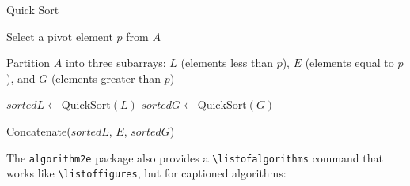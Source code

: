 \documentclass[11pt]{article}
\begin{document}
\begin{algorithm}[hbt!]
    \caption{Quick Sort}\label{alg:quick_sort}
    
    
    Select a pivot element $p$ from $A$ 
    
    Partition $A$ into three subarrays: $L$ (elements less than $p$), $E$ (elements equal to $p$), and $G$ (elements greater than $p$)
    
    $sortedL \gets \text{QuickSort}(L)$ 
    $sortedG \gets \text{QuickSort}(G)$ 
    
    \Return Concatenate($sortedL$, $E$, $sortedG$) 
    \end{algorithm}
    
    

The \verb|algorithm2e| package also provides a \verb|\listofalgorithms| command that works like \verb|\listoffigures|, but for captioned algorithms:

\listofalgorithms
\end{document}

